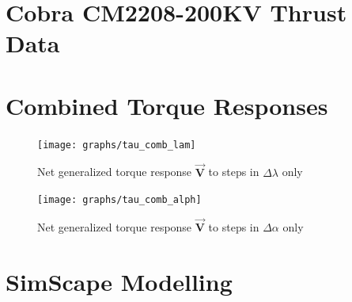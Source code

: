 \section{Cobra CM2208-200KV Thrust Data}
\label{app:cobra-test}
\centering
{}
\restoregeometry
\newpage
\section{Combined Torque Responses}
\label{app:tau-comb}
\begin{figure}[htbp]
\centering
\texttt{[image: graphs/tau\_comb\_lam]}
\caption{Net generalized torque response $\vec{\mathbf{V}}$ to steps in $\Delta\lambda$ only}
\end{figure}
\par
\begin{figure}[hbtp]
\centering
\texttt{[image: graphs/tau\_comb\_alph]}
\caption{Net generalized torque response $\vec{\mathbf{V}}$ to steps in $\Delta\alpha$ only}
\end{figure}
\newpage
\section{SimScape Modelling}
\label{app:simscape}
